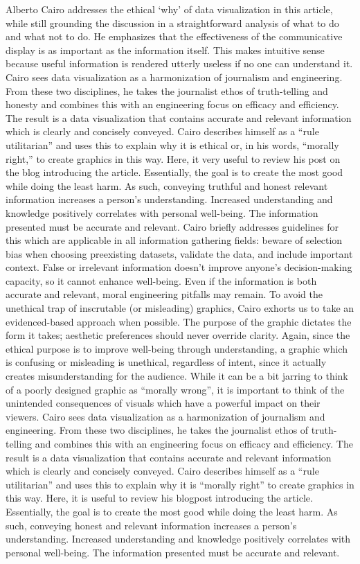 \documentclass[]{book}
\theoremstyle{definition}
\theoremstyle{definition}
\theoremstyle{definition}
\theoremstyle{remark}
\begin{document}
Alberto Cairo addresses the ethical `why' of data visualization in this
article, while still grounding the discussion in a straightforward
analysis of what to do and what not to do. He emphasizes that the
effectiveness of the communicative display is as important as the
information itself. This makes intuitive sense because useful
information is rendered utterly useless if no one can understand it.
Cairo sees data visualization as a harmonization of journalism and
engineering. From these two disciplines, he takes the journalist ethos
of truth-telling and honesty and combines this with an engineering focus
on efficacy and efficiency. The result is a data visualization that
contains accurate and relevant information which is clearly and
concisely conveyed. Cairo describes himself as a ``rule utilitarian''
and uses this to explain why it is ethical or, in his words, ``morally
right,'' to create graphics in this way. Here, it very useful to review
his post on the blog introducing the article. Essentially, the goal is
to create the most good while doing the least harm. As such, conveying
truthful and honest relevant information increases a person's
understanding. Increased understanding and knowledge positively
correlates with personal well-being. The information presented must be
accurate and relevant. Cairo briefly addresses guidelines for this which
are applicable in all information gathering fields: beware of selection
bias when choosing preexisting datasets, validate the data, and include
important context. False or irrelevant information doesn't improve
anyone's decision-making capacity, so it cannot enhance well-being. Even
if the information is both accurate and relevant, moral engineering
pitfalls may remain. To avoid the unethical trap of inscrutable (or
misleading) graphics, Cairo exhorts us to take an evidenced-based
approach when possible. The purpose of the graphic dictates the form it
takes; aesthetic preferences should never override clarity. Again, since
the ethical purpose is to improve well-being through understanding, a
graphic which is confusing or misleading is unethical, regardless of
intent, since it actually creates misunderstanding for the audience.
While it can be a bit jarring to think of a poorly designed graphic as
``morally wrong'', it is important to think of the unintended
consequences of visuals which have a powerful impact on their viewers.
Cairo sees data visualization as a harmonization of journalism and
engineering. From these two disciplines, he takes the journalist ethos
of truth-telling and combines this with an engineering focus on efficacy
and efficiency. The result is a data visualization that contains
accurate and relevant information which is clearly and concisely
conveyed. Cairo describes himself as a ``rule utilitarian'' and uses
this to explain why it is ``morally right'' to create graphics in this
way. Here, it is useful to review his blogpost introducing the article.
Essentially, the goal is to create the most good while doing the least
harm. As such, conveying honest and relevant information increases a
person's understanding. Increased understanding and knowledge positively
correlates with personal well-being. The information presented must be
accurate and relevant.
\end{document}
